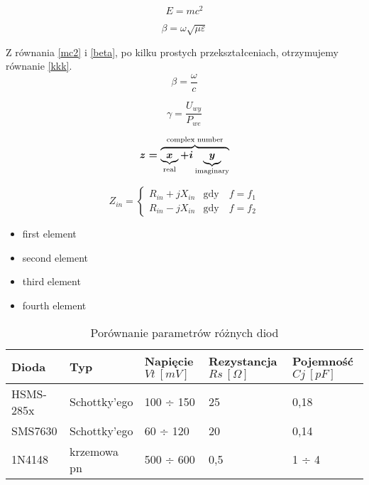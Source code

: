 
\begin{equation} \label{mc2}
E = mc^2
\end{equation}

\begin{equation} \label{beta}
\beta = \omega\sqrt{\mu\varepsilon}
\end{equation}

Z równania \eqref{mc2} i \eqref{beta}, po kilku prostych przekształceniach, otrzymujemy równanie \eqref{kkk}.
\begin{equation} \label{kkk}
\beta = \frac{\omega}{c}
\end{equation}

\begin{equation} \label{eqCzulosc}
\gamma =   \frac{U_{wy}}{P_{we}}
\end{equation}

\begin{equation} \label{test}
\boldmath
z = \overbrace{
    \underbrace{x}_\text{real} + i
    \underbrace{y}_\text{imaginary}
    }^\text{complex number}
\end{equation}

\begin{equation} \label{eqConj1}
Z_{in} = \left\{
  \begin{array}{lr}
    R_{in} + j X_{in} & \text{gdy}\quad f = f_1\\
    R_{in} - j X_{in} & \text{gdy}\quad f = f_2
  \end{array}
\right.
\end{equation}

\begin{itemize}
\item{first element}
\item{second element}
\item{third element}
\item{fourth element}
\end{itemize}

\begin{table}[H]
\centering
\caption{Porównanie parametrów różnych diod}
\label{Tab1}
\small
\begin{tabularx}{\textwidth}{ |X|X|X|X|X| }
\hline
Dioda & Typ & Napięcie\newline$Vt\:[mV]$ & Rezystancja $Rs\:[Ω]$& Pojemność $Cj\:[pF]$ \\
  \hline
HSMS-285x \cite{hsms285x} & Schottky'ego & 100 ÷ 150 & 25 & 0,18 \\
\hline
SMS7630 \cite{sms7630} & Schottky'ego & 60 ÷ 120 & 20 & 0,14 \\
\hline
1N4148 \cite{1n4148} & krzemowa pn & 500 ÷ 600 & 0,5 & 1 ÷ 4 \\
\hline
\end{tabularx}
\end{table}

